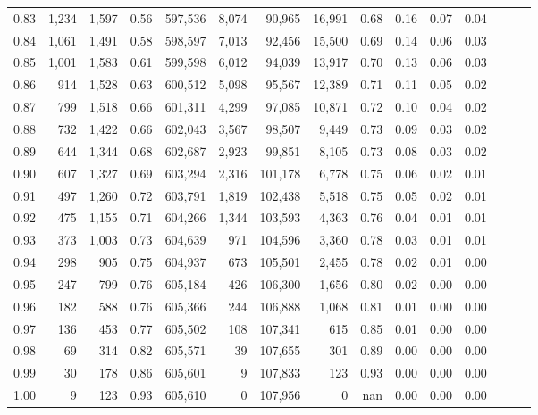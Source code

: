 \begin{tabular}{rrrrrrrrrrrrrrr}
0.83 &   1,234 &  1,597 &  0.56 &  597,536 &    8,074 &   90,965 &   16,991 &  0.68 &  0.16 &  0.07 &      0.04 \\
0.84 &   1,061 &  1,491 &  0.58 &  598,597 &    7,013 &   92,456 &   15,500 &  0.69 &  0.14 &  0.06 &      0.03 \\
0.85 &   1,001 &  1,583 &  0.61 &  599,598 &    6,012 &   94,039 &   13,917 &  0.70 &  0.13 &  0.06 &      0.03 \\
0.86 &     914 &  1,528 &  0.63 &  600,512 &    5,098 &   95,567 &   12,389 &  0.71 &  0.11 &  0.05 &      0.02 \\
0.87 &     799 &  1,518 &  0.66 &  601,311 &    4,299 &   97,085 &   10,871 &  0.72 &  0.10 &  0.04 &      0.02 \\
0.88 &     732 &  1,422 &  0.66 &  602,043 &    3,567 &   98,507 &    9,449 &  0.73 &  0.09 &  0.03 &      0.02 \\
0.89 &     644 &  1,344 &  0.68 &  602,687 &    2,923 &   99,851 &    8,105 &  0.73 &  0.08 &  0.03 &      0.02 \\
0.90 &     607 &  1,327 &  0.69 &  603,294 &    2,316 &  101,178 &    6,778 &  0.75 &  0.06 &  0.02 &      0.01 \\
0.91 &     497 &  1,260 &  0.72 &  603,791 &    1,819 &  102,438 &    5,518 &  0.75 &  0.05 &  0.02 &      0.01 \\
0.92 &     475 &  1,155 &  0.71 &  604,266 &    1,344 &  103,593 &    4,363 &  0.76 &  0.04 &  0.01 &      0.01 \\
0.93 &     373 &  1,003 &  0.73 &  604,639 &      971 &  104,596 &    3,360 &  0.78 &  0.03 &  0.01 &      0.01 \\
0.94 &     298 &    905 &  0.75 &  604,937 &      673 &  105,501 &    2,455 &  0.78 &  0.02 &  0.01 &      0.00 \\
0.95 &     247 &    799 &  0.76 &  605,184 &      426 &  106,300 &    1,656 &  0.80 &  0.02 &  0.00 &      0.00 \\
0.96 &     182 &    588 &  0.76 &  605,366 &      244 &  106,888 &    1,068 &  0.81 &  0.01 &  0.00 &      0.00 \\
0.97 &     136 &    453 &  0.77 &  605,502 &      108 &  107,341 &      615 &  0.85 &  0.01 &  0.00 &      0.00 \\
0.98 &      69 &    314 &  0.82 &  605,571 &       39 &  107,655 &      301 &  0.89 &  0.00 &  0.00 &      0.00 \\
0.99 &      30 &    178 &  0.86 &  605,601 &        9 &  107,833 &      123 &  0.93 &  0.00 &  0.00 &      0.00 \\
1.00 &       9 &    123 &  0.93 &  605,610 &        0 &  107,956 &        0 &   nan &  0.00 &  0.00 &      0.00 \\
\bottomrule
\end{tabular}
